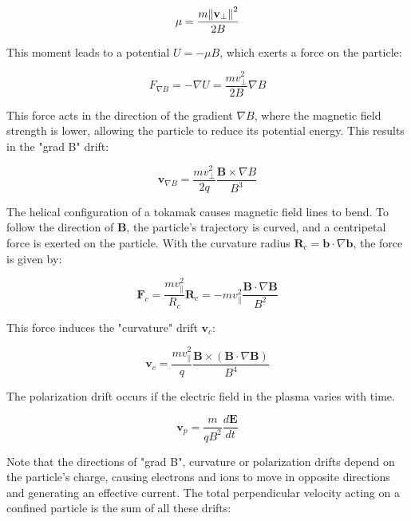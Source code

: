 \begin{equation}
	\mu = \frac{m\norm{\mathbf{v}_\perp}^2}{2B}
\end{equation}

This moment leads to a potential $U = -\mu B$, which exerts a force on the particle:

\begin{equation}
	F_{\nabla B} = -\nabla U = \frac{mv_\perp^2}{2B}\nabla B
\end{equation}

This force acts in the direction of the gradient $\nabla B$, where the magnetic field strength is lower, allowing the particle to reduce its potential energy. This results in the "grad B" drift:

\begin{equation}
	\mathbf{v}_{\nabla B} = \frac{mv_\perp^2}{2q} \frac{\mathbf{B} \times \nabla B}{B^3}
\end{equation}

The helical configuration of a tokamak causes magnetic field lines to bend. To follow the direction of $\mathbf{B}$, the particle's trajectory is curved, and a centripetal force is exerted on the particle. With the curvature radius $\mathbf{R}_c = \mathbf{b} \cdot \nabla \mathbf{b}$, the force is given by:

\begin{equation}
	\mathbf{F}_c = \frac{mv_\parallel^2}{R_c}\mathbf{R}_c = -mv_\parallel^2\frac{\mathbf{B} \cdot \nabla \mathbf{B}}{B^2}
\end{equation}

This force induces the "curvature" drift $\mathbf{v}_c$:

\begin{equation}
	\mathbf{v}_c = \frac{mv_\parallel^2}{q}\frac{\mathbf{B} \times (\mathbf{B} \cdot \nabla \mathbf{B})}{B^4}
\end{equation}

The polarization drift occurs if the electric field in the plasma varies with time. 

\begin{equation}
	\mathbf{v}_p = \frac{m}{qB^2}\frac{d\mathbf{E}}{dt}
\end{equation}

Note that the directions of "grad B", curvature or polarization drifts depend on the particle's charge, causing electrons and ions to move in opposite directions and generating an effective current. The total perpendicular velocity acting on a confined particle is the sum of all these drifts:

